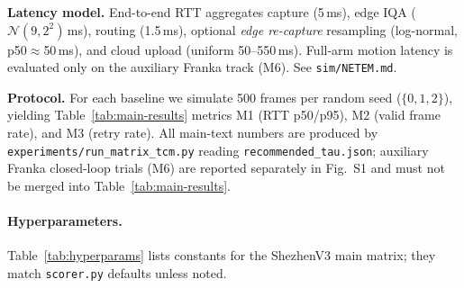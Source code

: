 \textbf{Latency model.} End-to-end RTT aggregates capture (5\,ms), edge IQA ($\mathcal{N}(9,2^2)$\,ms), routing (1.5\,ms), optional \emph{edge re-capture} resampling (log-normal, p50$\approx$50\,ms), and cloud upload (uniform 50--550\,ms). Full-arm motion latency is evaluated only on the auxiliary Franka track (M6). See \texttt{sim/NETEM.md}.

\textbf{Protocol.} For each baseline we simulate 500 frames per random seed ($\{0,1,2\}$), yielding Table~\ref{tab:main-results} metrics M1 (RTT p50/p95), M2 (valid frame rate), and M3 (retry rate).
All main-text numbers are produced by \texttt{experiments/run\_matrix\_tcm.py} reading \texttt{recommended\_tau.json}; auxiliary Franka closed-loop trials (M6) are reported separately in Fig.~S1 and must not be merged into Table~\ref{tab:main-results}.

\paragraph{Hyperparameters.}
Table~\ref{tab:hyperparams} lists constants for the ShezhenV3 main matrix; they match \texttt{scorer.py} defaults unless noted.

\begin{table}[t]
\centering
\caption{Key hyperparameters (Paper~I, ShezhenV3 main matrix).}
\label{tab:hyperparams}
\small
{}
\end{table}
